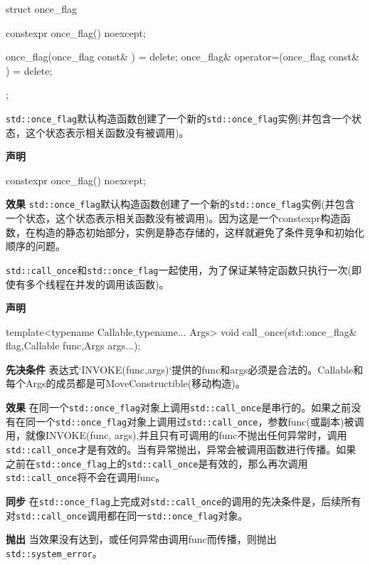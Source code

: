 \begin{cpp}
struct once_flag
{
  constexpr once_flag() noexcept;

  once_flag(once_flag const& ) = delete;
  once_flag& operator=(once_flag const& ) = delete;
};
\end{cpp}


\texttt{std::once\_flag}默认构造函数创建了一个新的\texttt{std::once\_flag}实例(并包含一个状态，这个状态表示相关函数没有被调用)。

\textbf{声明}

\begin{cpp}
constexpr once_flag() noexcept;
\end{cpp}

\textbf{效果}
\texttt{std::once\_flag}默认构造函数创建了一个新的\texttt{std::once\_flag}实例(并包含一个状态，这个状态表示相关函数没有被调用)。因为这是一个constexpr构造函数，在构造的静态初始部分，实例是静态存储的，这样就避免了条件竞争和初始化顺序的问题。


\texttt{std::call\_once}和\texttt{std::once\_flag}一起使用，为了保证某特定函数只执行一次(即使有多个线程在并发的调用该函数)。

\textbf{声明}

\begin{cpp}
template<typename Callable,typename... Args>
void call_once(std::once_flag& flag,Callable func,Args args...);
\end{cpp}

\textbf{先决条件}
表达式`INVOKE(func,args)`提供的func和args必须是合法的。Callable和每个Args的成员都是可MoveConstructible(移动构造)。

\textbf{效果}
在同一个\texttt{std::once\_flag}对象上调用\texttt{std::call\_once}是串行的。如果之前没有在同一个\texttt{std::once\_flag}对象上调用过\texttt{std::call\_once}，参数func(或副本)被调用，就像INVOKE(func, args),并且只有可调用的func不抛出任何异常时，调用\texttt{std::call\_once}才是有效的。当有异常抛出，异常会被调用函数进行传播。如果之前在\texttt{std::once\_flag}上的\texttt{std::call\_once}是有效的，那么再次调用\texttt{std::call\_once}将不会在调用func。

\textbf{同步}
在\texttt{std::once\_flag}上完成对\texttt{std::call\_once}的调用的先决条件是，后续所有对\texttt{std::call\_once}调用都在同一\texttt{std::once\_flag}对象。

\textbf{抛出}
当效果没有达到，或任何异常由调用func而传播，则抛出\texttt{std::system\_error}。